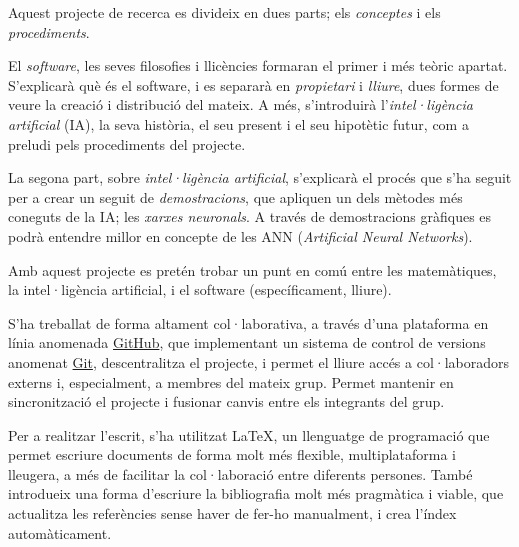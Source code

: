 Aquest projecte de recerca es divideix en dues parts; els \emph{conceptes}
i els \emph{procediments}.

El \emph{software}, les seves filosofies i llicències formaran el primer i més
teòric apartat. S'explicarà què és el software, i es separarà en \emph{propietari}
i \emph{lliure}, dues formes de veure la creació i distribució del mateix. A més,
s'introduirà l'\emph{intel·ligència artificial} (IA), la seva història, el seu present i el
seu hipotètic futur, com a preludi pels procediments del projecte.

La segona part, sobre \emph{intel·ligència artificial}, s'explicarà el procés
que s'ha seguit per a crear un seguit de \emph{demostracions}, que apliquen un
dels mètodes més coneguts de la IA; les \emph{xarxes neuronals}. A través de demostracions
gràfiques es podrà entendre millor en concepte de les ANN (\emph{Artificial Neural Networks}).

Amb aquest projecte es pretén trobar un punt en comú entre les matemàtiques,
la intel·ligència artificial, i el software (específicament, lliure).

S'ha treballat de forma altament col·laborativa, a través d'una plataforma
en línia anomenada \href{http://github.com}{GitHub}, que implementant un sistema
de control de versions anomenat \href{http://git-scm.com/}{Git}, descentralitza
el projecte, i permet el lliure accés a col·laboradors externs i, especialment, a membres
del mateix grup. Permet mantenir en sincronització el projecte i fusionar canvis entre els integrants del grup.

Per a realitzar l'escrit, s'ha utilitzat \LaTeX, un llenguatge de programació que permet escriure documents de forma molt més flexible, multiplataforma i lleugera, a més de facilitar la col·laboració entre diferents persones. També introdueix una forma d'escriure la bibliografia molt més pragmàtica i viable, que actualitza les referències sense haver de fer-ho manualment, i crea l'índex automàticament.